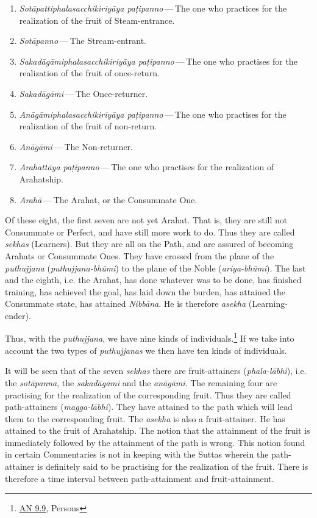\begin{enumerate}

\item{\emph{Sotāpattiphalasacchikiriyāya paṭipanno} — The one who practices for the realization of the fruit of Steam-entrance.}

\item{\emph{Sotāpanno} — The Stream-entrant.}

\item{\emph{Sakadāgāmiphalasacchikiriyāya paṭipanno} — The one who practises for the realization of the fruit of once-return.}

\item{\emph{Sakadāgāmi} — The Once-returner.}

\item{\emph{Anāgāmiphalasacchikiriyāya paṭipanno} — The one who practises for the realization of the fruit of non-return.}

\item{\emph{Anāgāmi} — The Non-returner.}

\item{\emph{Arahattāya paṭipanno} — The one who practises for the realization of Arahatship.}

\item{\emph{Arahā} — The Arahat, or the Consummate One.}

\end{enumerate}


Of these eight, the first seven are not yet Arahat. That is, they are
still not Consummate or Perfect, and have still more work to do. Thus
they are called \emph{sekhas} (Learners). But they are all on the Path, and
are assured of becoming Arahats or Consummate Ones. They have crossed
from the plane of the \emph{puthujjana} (\emph{puthujjana-bhūmi}) to the plane
of the Noble (\emph{ariya-bhūmi}). The last and the eighth, i.e. the
Arahat, has done whatever was to be done, has finished training, has
achieved the goal, has laid down the burden, has attained the Consummate
state, has attained \emph{Nibbāna}. He is therefore \emph{asekha} (Learning-ender).


Thus, with the \emph{puthujjana}, we have nine kinds of
individuals.\footnote{\href{https://suttacentral.net/an9.9/en/sujato}{AN 9.9}, Persons}
If we take into account the two types of \emph{puthujjanas} we then have ten kinds of individuals.


It will be seen that of the seven \emph{sekhas} there are fruit-attainers
(\emph{phala-lābhi}), i.e. the \emph{sotāpanna}, the \emph{sakadāgāmi} and the
\emph{anāgāmi}. The remaining four are practising for the realization of
the corresponding fruit. Thus they are called path-attainers
(\emph{magga-lābhi}). They have attained to the path which will lead them
to the corresponding fruit. The \emph{asekha} is also a fruit-attainer. He
has attained to the fruit of Arahatship. The notion that the attainment
of the fruit is immediately followed by the attainment of the path is
wrong. This notion found in certain Commentaries is not in keeping with
the Suttas wherein the path-attainer is definitely said to be
practising for the realization of the fruit. There is therefore a time
interval between path-attainment and fruit-attainment.


